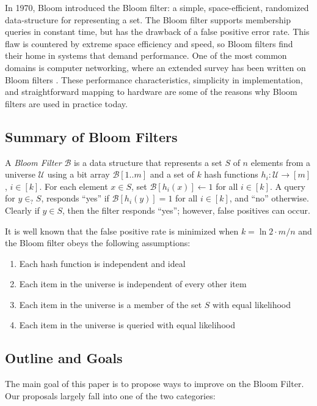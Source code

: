 \documentclass[../main-paper.tex]{subfiles}
\begin{document}
In 1970, Bloom \cite{Bloom:70} introduced the Bloom filter: a simple, space-efficient, randomized data-structure for representing a set. The Bloom filter supports membership queries in constant time, but has the drawback of a false positive error rate. This flaw is countered by extreme space efficiency and speed, so Bloom filters find their home in systems that demand performance. One of the most common domains is computer networking, where an extended survey has been written on Bloom filters \cite{broder2003}. These performance characteristics, simplicity in implementation, and straightforward mapping to hardware are some of the reasons why Bloom filters are used in practice today.

\subsection{Summary of Bloom Filters}
A \emph{Bloom Filter} $\mathcal{B}$ is a data structure that represents a set $S$ of $n$ elements from a universe $\mathcal{U}$ using a bit array $\mathcal{B}[1..m]$ and a set of $k$ hash functions $h_i : \mathcal{U} \to [m]$, $i \in [k]$. For each element $x \in S$, set $\mathcal{B}[h_i(x)] \gets 1$ for all $i \in [k]$. A query for $y \in_? S$, responds ``yes'' if $\mathcal{B}[h_i(y)] = 1$ for all $i \in [k]$, and ``no'' otherwise. Clearly if $y \in S$, then the filter responds ``yes''; however, false positives can occur.

It is well known that the false positive rate is minimized when $k = \ln 2 \cdot m/n$ \cite{jeffe2015bloom} and the Bloom filter obeys the following assumptions:

\begin{enumerate}
\item Each hash function is independent and ideal
\item Each item in the universe is independent of every other item
\item Each item in the universe is a member of the set $S$ with equal likelihood
\item Each item in the universe is queried with equal likelihood
\end{enumerate}

\subsection{Outline and Goals}

The main goal of this paper is to propose ways to improve on the Bloom Filter. Our proposals largely fall into one of the two categories:
\end{document}
